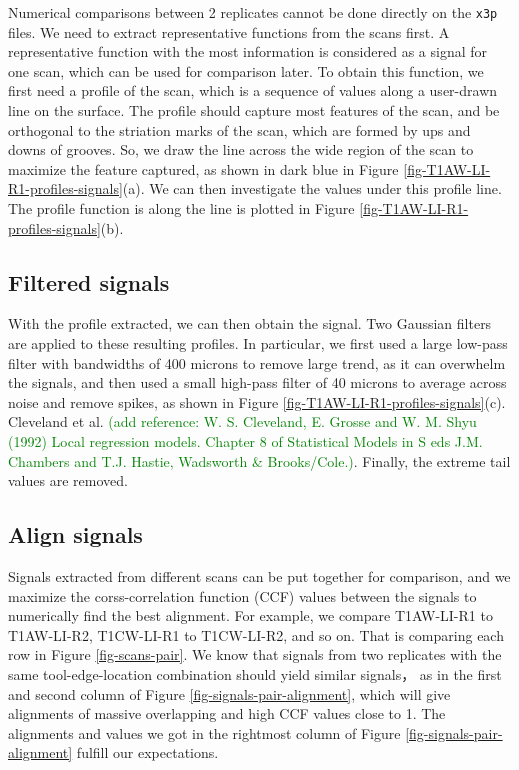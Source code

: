 \documentclass[fleqn,10pt]{wlscirep}
\newcommand{\hh}[1]{{\textcolor{Green}{#1}}}
\begin{document}
Numerical comparisons between 2 replicates cannot be done directly on
the \texttt{x3p} files. We need to extract representative functions from
the scans first. A representative function with the most information is
considered as a signal for one scan, which can be used for comparison
later. To obtain this function, we first need a profile of the scan,
which is a sequence of values along a user-drawn line on the surface.
The profile should capture most features of the scan, and be orthogonal
to the striation marks of the scan, which are formed by ups and downs of
grooves. So, we draw the line across the wide region of the scan to
maximize the feature captured, as shown in dark blue in Figure
\ref{fig-T1AW-LI-R1-profiles-signals}(a). We can then investigate the
values under this profile line. The profile function is along the line
is plotted in Figure \ref{fig-T1AW-LI-R1-profiles-signals}(b).

\subsection*{Filtered signals}\label{sec-filtered-signals}

With the profile extracted, we can then obtain the signal. Two Gaussian
filters are applied to these resulting profiles. In particular, we first
used a large low-pass filter with bandwidths of 400 microns to remove
large trend, as it can overwhelm the signals, and then used a small
high-pass filter of 40 microns to average across noise and remove
spikes, as shown in Figure \ref{fig-T1AW-LI-R1-profiles-signals}(c).
Cleveland et al. \citep{clevelandLocalRegressionModels1992}
\hh{(add reference: W. S. Cleveland, E. Grosse and W. M. Shyu (1992) Local regression models. Chapter 8 of Statistical Models in S eds J.M. Chambers and T.J. Hastie, Wadsworth \& Brooks/Cole.)}.
Finally, the extreme tail values are removed.

\subsection*{Align signals}\label{sec-align-signals}

Signals extracted from different scans can be put together for
comparison, and we maximize the corss-correlation function (CCF) values
between the signals to numerically find the best alignment. For example,
we compare T1AW-LI-R1 to T1AW-LI-R2, T1CW-LI-R1 to T1CW-LI-R2, and so
on. That is comparing each row in Figure \ref{fig-scans-pair}. We know
that signals from two replicates with the same tool-edge-location
combination should yield similar signals， as in the first and second
column of Figure \ref{fig-signals-pair-alignment}, which will give
alignments of massive overlapping and high CCF values close to 1. The
alignments and values we got in the rightmost column of Figure
\ref{fig-signals-pair-alignment} fulfill our expectations.
\end{document}
